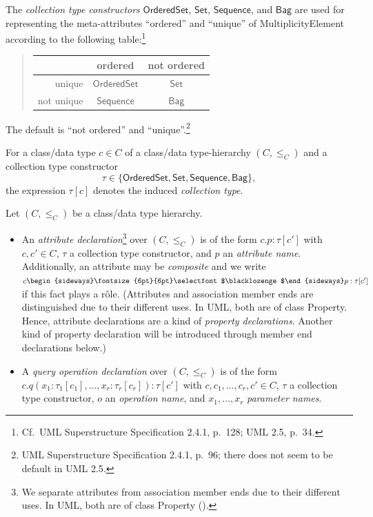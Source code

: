 \documentclass[10pt,fleqn,final]{scrreprt}
\newenvironment{definitions}[0]{\medskip }{}
\newcommand{\uml}[1]{\textsf{#1}}
\newcommand{\composition}{\raisebox{0.2pt}{\begin{sideways}\fontsize{6pt}{6pt}\selectfont$\blacklozenge$\end{sideways}}}
\begin{document}
\begin{definitions}
\medskip
 The \emph{collection type constructors} $\mathsf{OrderedSet}$,
$\mathsf{Set}$, $\mathsf{Sequence}$, and $\mathsf{Bag}$ are used for
representing the meta-attributes ``ordered'' and ``unique'' of
\uml{MultiplicityElement} according to the following
table:\footnote{Cf.~UML Superstructure Specification 2.4.1, p.~128; UML
  2.5, p.~34.}
%
\begin{quotation}
\begin{tabular}{@{}r||c|c@{}}
             & ordered               & not ordered\\
\hline\hline
  unique     & $\mathsf{OrderedSet}$ & $\mathsf{Set}$\\
\hline
  not unique & $\mathsf{Sequence}$   & $\mathsf{Bag}$
\end{tabular}
\end{quotation}
%
The default is ``not ordered'' and ``unique''.\footnote{UML
  Superstructure Specification 2.4.1, p.~96; there does not seem to be
  default in UML 2.5.}

For a class/data type $c \in C$ of a class/data type-hierarchy
$(C, {\leq_C})$ and a collection type constructor
$$\tau \in \{ \mathsf{OrderedSet}, \mathsf{Set}, \mathsf{Sequence},
\mathsf{Bag} \},$$
 the expression $\tau[c]$ denotes the induced \emph{collection type}.

\medskip
Let $(C, {\leq_C})$ be a class/data type hierarchy.
%
\begin{itemize}[label={--}, leftmargin=*]
  \item An \emph{attribute declaration}\footnote{We separate attributes
 from association member ends due to their different uses.  In UML,
 both are of class \uml{Property} (\cite[p.~109]{uml-2.5}).} over $(C, {\leq_C})$ is of the form
$c.p : \tau[c']$ with $c, c' \in C$, $\tau$ a collection type
constructor, and $p$ an \emph{attribute name}. Additionally, an attribute may be \emph{composite} and we write
$c\composition p : \tau[c']$ if this fact plays a rôle. (Attributes
  and association member ends are distinguished due to their different uses.  In UML,
  both are of class \uml{Property}. Hence, attribute 
declarations are a kind of \emph{property declarations}. Another
kind of property declaration will be introduced through member end
declarations below.) 

  \item A \emph{query operation declaration} over $(C, {\leq_C})$ is of
the form $c.q(x_1 : \tau_1[c_1], \dots, x_r : \tau_r[c_r]) : \tau[c']$
with $c, c_1,\ldots, c_r, c' \in C$, $\tau$ a collection type
constructor, $o$ an \emph{operation name}, and $x_1, \ldots, x_r$
\emph{parameter names}.


\end{itemize}
\end{definitions}
\end{document}
